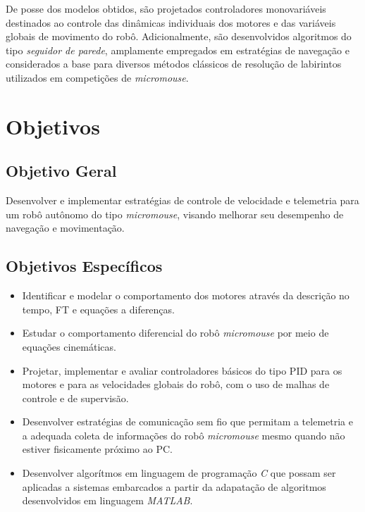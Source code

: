         De posse dos modelos obtidos, são projetados controladores monovariáveis destinados ao controle das dinâmicas individuais dos motores e das variáveis globais de movimento do robô. Adicionalmente, são desenvolvidos algoritmos do tipo \textit{seguidor de parede}, amplamente empregados em estratégias de navegação e considerados a base para diversos métodos clássicos de resolução de labirintos utilizados em competições de \textit{micromouse}.

    \section{Objetivos} \label{sec:objetivos}

        \subsection{Objetivo Geral} \label{ssec:objetivo-geral}

        Desenvolver e implementar estratégias de controle de velocidade e telemetria para um robô autônomo do tipo \textit{micromouse}, visando melhorar seu desempenho de navegação e movimentação.

        \subsection{Objetivos Específicos} \label{ssec:objetivos-especificos}

        \begin{itemize}
            \item Identificar e modelar o comportamento dos motores através da descrição no tempo, \gls{FT} e equações a diferenças.
            \item Estudar o comportamento diferencial do robô \textit{micromouse} por meio de equações cinemáticas.
            \item Projetar, implementar e avaliar controladores básicos do tipo \gls{PID} para os motores e para as velocidades globais do robô, com o uso de malhas de controle e de supervisão.
            \item Desenvolver estratégias de comunicação sem fio que permitam a telemetria e a adequada coleta de informações do robô \textit{micromouse} mesmo quando não estiver fisicamente próximo ao \gls{PC}.
            \item Desenvolver algorítmos em linguagem de programação \textit{C} que possam ser aplicadas a sistemas embarcados a partir da adapatação de algoritmos desenvolvidos em linguagem \textit{MATLAB}.
        \end{itemize}

